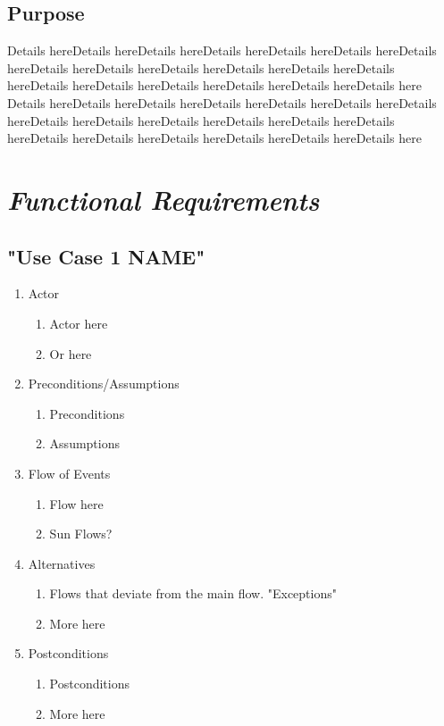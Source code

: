 \documentclass[12pt]{article}
\begin{document}
	\subsection{Purpose}
	Details hereDetails hereDetails hereDetails hereDetails hereDetails hereDetails hereDetails hereDetails hereDetails hereDetails hereDetails hereDetails hereDetails hereDetails hereDetails hereDetails hereDetails hereDetails here	Details hereDetails hereDetails hereDetails hereDetails hereDetails hereDetails hereDetails hereDetails hereDetails hereDetails hereDetails hereDetails hereDetails hereDetails hereDetails hereDetails hereDetails hereDetails here


\section{\emph{Functional Requirements}}
	\subsection{"Use Case 1 NAME"}
\begin{enumerate}
  \item Actor
  \begin{enumerate}
  		\item Actor here
   		 \item Or here
  \end{enumerate}
  \item Preconditions/Assumptions
  \begin{enumerate}
   		 \item Preconditions 
   		 \item Assumptions
  \end{enumerate}
  \item Flow of Events
  \begin{enumerate}
   		 \item Flow here
   		 \item Sun Flows?
  \end{enumerate}
  \item Alternatives
  \begin{enumerate}
    		\item Flows that deviate from the main flow. "Exceptions"
    		\item More here
  \end{enumerate}
  \item  Postconditions
  \begin{enumerate}
    		\item Postconditions
    		\item More here
  \end{enumerate}
\end{enumerate}
\end{document}
